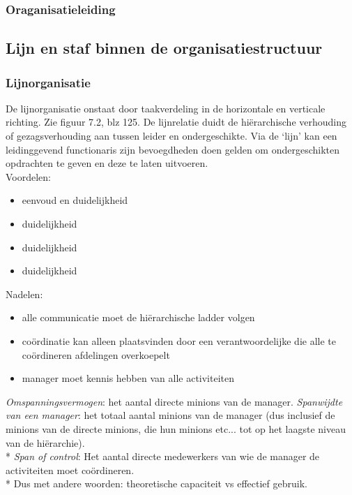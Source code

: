\documentclass[12pt]{article}
\begin{document}
\subsubsection{Oraganisatieleiding}
\subsection{Lijn en staf binnen de organisatiestructuur}
\subsubsection{Lijnorganisatie}
De lijnorganisatie onstaat door taakverdeling in de horizontale en verticale richting. Zie figuur 7.2, blz 125. De lijnrelatie duidt de hi\"erarchische verhouding of gezagsverhouding aan tussen leider en ondergeschikte. Via de `lijn' kan een leidinggevend functionaris zijn bevoegdheden doen gelden om ondergeschikten opdrachten te geven en deze te laten uitvoeren.\\
Voordelen:
\begin{itemize}
\item eenvoud en duidelijkheid
\item duidelijkheid
\item duidelijkheid
\item duidelijkheid
\end{itemize}
Nadelen:
\begin{itemize}
\item alle communicatie moet de hi\"erarchische ladder volgen
\item co\"ordinatie kan alleen plaatsvinden door een verantwoordelijke die alle te co\"ordineren afdelingen overkoepelt
\item manager moet kennis hebben van alle activiteiten
\end{itemize}
\textit{Omspanningsvermogen}: het aantal directe minions van de manager.
\textit{Spanwijdte van een manager}: het totaal aantal minions van de manager (dus inclusief de minions van de directe minions, die hun minions etc... tot op het laagste niveau van de hi\"erarchie).\\*
\textit{Span of control}: Het aantal directe medewerkers van wie de manager de activiteiten moet co\"ordineren.\\*
Dus met andere woorden: theoretische capaciteit vs effectief gebruik.
\end{document}
